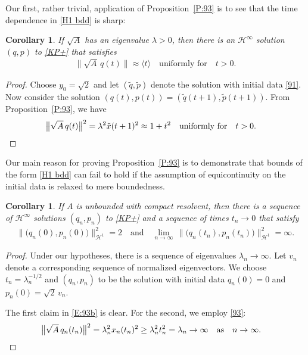 \documentclass{amsart}
\newcommand{\qtq}[1]{\quad\text{#1}\quad}
\newtheorem{corollary}[theorem]{Corollary}
\theoremstyle{definition}
\numberwithin{equation}{section}
\renewcommand{\H}{\mathcal H}
\newcommand{\la}{\langle}
\newcommand{\ra}{\rangle}
\begin{document}
Our first, rather trivial, application of Proposition~\ref{P:93} is to see that the time dependence in \eqref{H1 bdd} is sharp:

\begin{corollary}\label{C:93a}
If $\sqrt A$ has an eigenvalue $\lambda >0$, then there is an $\H^\infty$ solution $(q,p)$ to \eqref{KP+} that satisfies
\begin{align*}
\bigl\| \sqrt{A}\,q(t) \bigr\| \approx \la t\ra \qtq{uniformly for} t>0.
\end{align*}
\end{corollary}

\begin{proof}
Choose $y_0=\sqrt 2$ and let $(\tilde q,\tilde p)$ denote the solution with initial data \eqref{91}.  Now consider the solution $(q(t),p(t))=(\tilde q(t+1),\tilde p(t+1))$.  From Proposition~\ref{P:93}, we have
\begin{align*}
\bigl\| \sqrt A \, q(t) \bigr\|^2 &= \lambda^2 \tilde x(t+1)^2 \approx 1+t^2 \qtq{uniformly for} t>0. \qedhere
\end{align*}
\end{proof}


Our main reason for proving Proposition~\ref{P:93} is to demonstrate that bounds of the form \eqref{H1 bdd} can fail to hold if the assumption of equicontinuity on the initial data is relaxed to mere boundedness.


\begin{corollary}\label{C:93b}
If $A$ is unbounded with compact resolvent, then there is a sequence of $\H^\infty$ solutions $(q_n,p_n)$ to \eqref{KP+} and a sequence of times $t_n\to 0$ that satisfy 
\begin{align}\label{E:93b}
\bigl\| \bigl(q_n(0), p_n(0)\bigr) \bigr\|_{\H^1}^2 = 2 \qtq{and}
\lim_{n\to \infty}\, \bigl\| \bigl(q_n(t_n), p_n(t_n)\bigr) \bigr\|_{\H^1}^2= \infty .
\end{align}
\end{corollary}

\begin{proof}
Under our hypotheses, there is a sequence of eigenvalues $\lambda_n\to\infty$.  Let $v_n$ denote a corresponding sequence of normalized eigenvectors.  We choose $t_n=\lambda_n^{-1/2}$ and $(q_n,p_n)$ to be the solution with initial data $q_n(0)=0$ and $p_n(0)=\sqrt2\,v_n$. 

The first claim in \eqref{E:93b} is clear.  For the second, we employ \eqref{93}:
\begin{align}
\bigl\| \sqrt A \, q_n(t_n) \bigr\|^2 &= \lambda_n^2 x_n(t_n)^2 \geq  \lambda_n^2 t_n^2 = \lambda_n \to \infty \qtq{as} n\to \infty. \qedhere
\end{align}
\end{proof}
\end{document}
